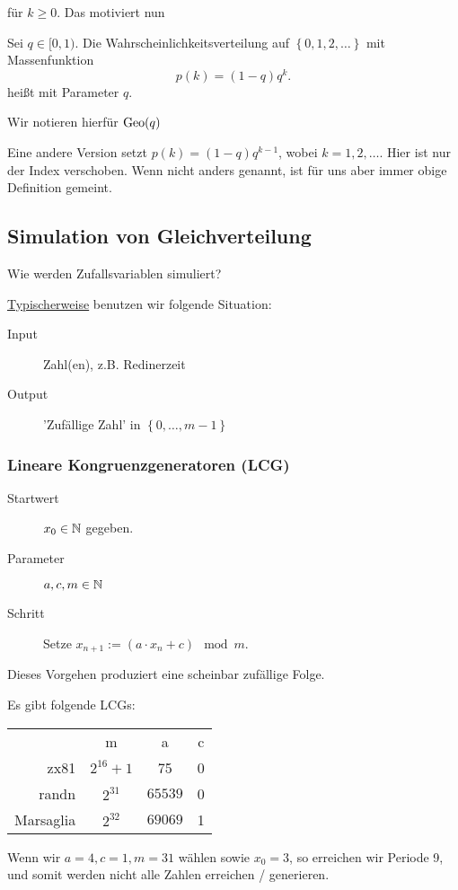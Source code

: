     für $k\geq 0$. Das motiviert nun
    \begin{definition}\label{def:geometrische-verteilung}
        Sei  $q\in [0,1)$. Die Wahrscheinlichkeitsverteilung auf $\left \{0,1,2,\ldots\right\} $ mit Massenfunktion
        \[
            p(k) = (1-q)q^k
        .\] 
        heißt  mit Parameter $q$.
    \end{definition}
    \begin{notation}
        Wir notieren hierfür $\operatorname{Geo}(q)$
    \end{notation}
    \begin{warning}
        Eine andere Version setzt $p(k) = (1-q)q^{k-1}$, wobei $k=1,2,\ldots$. Hier ist nur der Index verschoben. Wenn nicht anders genannt, ist für uns aber immer obige Definition gemeint.
    \end{warning}
\subsection{Simulation von Gleichverteilung}
\begin{question}
    Wie werden Zufallsvariablen simuliert?
\end{question}
\underline{Typischerweise} benutzen wir folgende Situation:
\begin{description}
    \item[Input] Zahl(en), z.B. Redinerzeit
    \item[Output] 'Zufällige Zahl' in $\left \{0,\ldots,m-1\right\} $
\end{description}

\subsubsection{Lineare Kongruenzgeneratoren (LCG)}
\begin{description}
    \item[Startwert] $x_0\in \mathbb{N}$ gegeben.
    \item[Parameter] $a,c,m\in \mathbb{N}$
    \item[Schritt] Setze $x_{n+1} := (a\cdot x_n + c) \mod m$.
\end{description}
Dieses Vorgehen produziert eine scheinbar zufällige Folge.
\begin{example}
    Es gibt folgende LCGs: \\
        \begin{tabular}{r|c|c|c}
            & m & a & c \\
            {\sc zx81} & $2^{16}+1$ & 75 & 0 \\
            {\sc randn} &  $2^{31}$&$65539$  & 0\\
            Marsaglia & $2^{32}$ & $69069$ & 1
        \end{tabular}
\end{example}
\begin{example}
    Wenn wir $a=4, c=1, m=31$ wählen sowie  $x_0 = 3$,  so erreichen wir Periode 9, und somit werden nicht alle Zahlen erreichen / generieren. 
\end{example}

